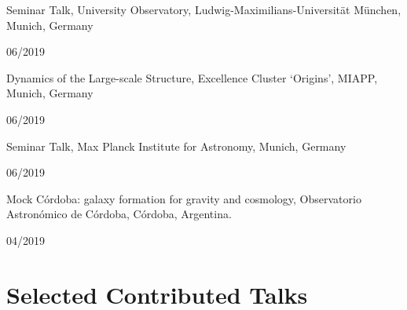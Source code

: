 \documentclass[12pt, a4paper]{article} %
\begin{document}
\begin{minipage}[t]{0.7\textwidth}
\begin{flushleft}%
  \setlength{\leftskip}{0.2cm}%
Seminar Talk, University Observatory, Ludwig-Maximilians-Universität München, Munich, Germany
\end{flushleft}
\end{minipage}
\begin{minipage}[t]{0.3\textwidth}
\hfill 06/2019
\end{minipage}
\vspace{0.2cm}

\begin{minipage}[t]{0.7\textwidth}
\begin{flushleft}%
  \setlength{\leftskip}{0.2cm}%
Dynamics of the Large-scale Structure, Excellence Cluster `Origins', MIAPP, Munich, Germany
\end{flushleft}
\end{minipage}
\begin{minipage}[t]{0.3\textwidth}
\hfill 06/2019
\end{minipage}
\vspace{0.2cm}

\begin{minipage}[t]{0.7\textwidth}
\begin{flushleft}%
  \setlength{\leftskip}{0.2cm}%
Seminar Talk, Max Planck Institute for Astronomy, Munich, Germany
\end{flushleft}
\end{minipage}
\begin{minipage}[t]{0.3\textwidth}
\hfill 06/2019
\end{minipage}
\vspace{0.2cm}


\begin{minipage}[t]{0.7\textwidth}
\begin{flushleft}%
  \setlength{\leftskip}{0.2cm}%
Mock C\'ordoba: galaxy formation for gravity and cosmology, Observatorio Astronómico de Córdoba, C\'ordoba, Argentina.
\end{flushleft}
\end{minipage}
\begin{minipage}[t]{0.3\textwidth}
\hfill 04/2019
\end{minipage}

\section*{Selected Contributed Talks}
\end{document}
